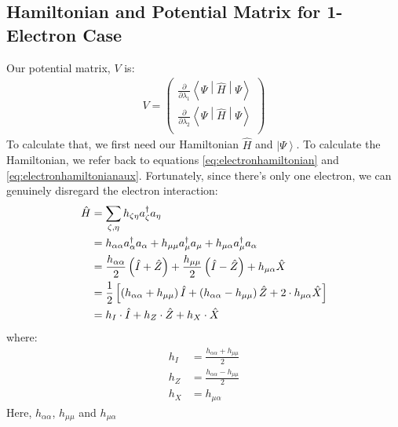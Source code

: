 \documentclass{aux/ttuthes2007}
\newcommand{\ket}[1]{\ensuremath{\left|#1\right\rangle}}
\newcommand{\sandwich}[3]{\left< #1 \middle\vert #2 \middle\vert #3 \right>}
\newcommand{\paren}[1]{\left( #1 \right)}
\newcommand{\pd}[1]{\frac{\partial}{\partial #1}}
\newcommand{\anio}[1]{a_{\oo{#1}}}
\newcommand{\aniu}[1]{a_{\uo{#1}}}
\newcommand{\anig}[1]{a_{\go{#1}}}
\newcommand{\creo}[1]{a^\dagger_{\oo{#1}}}
\newcommand{\creu}[1]{a^\dagger_{\uo{#1}}}
\newcommand{\creg}[1]{a^\dagger_{\go{#1}}}
\newcommand{\uo}[1]{
		\IfEqCase{#1}{
			{0}{\mu}
			{1}{\nu}
			{2}{\xi}
		}[\PackageError{uo}{Undefined option to uo: #1}{}]
}
\newcommand{\oo}[1]{
		\IfEqCase{#1}{
			{0}{\alpha}
			{1}{\beta}
			{2}{\gamma}
		}[\PackageError{unocorb}{Undefined option to unuo: #1}{}]
}
\newcommand{\go}[1]{
		\IfEqCase{#1}{
			{0}{\zeta}
			{1}{\eta}
			{2}{\iota}
			{3}{\kappa}
		}[\PackageError{unocorb}{Undefined option to go: #1}{}]
}
\begin{document}
\subsection{\textbf{Hamiltonian and Potential Matrix for 1-Electron Case}}

Our potential matrix, $V$ is:
%
\begin{equation*}
	\begin{split}
		V = \begin{pmatrix}
			\pd {\lambda_1} \sandwich {\Psi}{\hat H}{\Psi}\\
			\pd {\lambda_2} \sandwich {\Psi}{\hat H}{\Psi}\\
		\end{pmatrix}
	\end{split}
\end{equation*}
%
To calculate that, we first need our Hamiltonian $\hat H$ and $\ket \Psi$. To calculate the Hamiltonian, we refer back to equations \ref{eq:electronhamiltonian} and \ref{eq:electronhamiltonianaux}. Fortunately, since there's only one electron, we can genuinely disregard the electron interaction:
%
\begin{equation*}
	\begin{split}
	\hat H  &= \sum_{\go 0, \go 1}h_{\go 0 \go 1}\creg 0 \anig 1 \\
		&= {h_{\alpha\alpha}} \creo 0 \anio 0
		+ {h_{\mu\mu}} \creu 0 \aniu 0
		+ h_{\mu\alpha} \creu 0 \anio 0 
%
		\\
%
		&= \frac{h_{\alpha\alpha}}{2} \paren{\hat I + \hat Z}
		+ \frac{h_{\mu\mu}}{2} \paren{\hat I - \hat Z}
		+ h_{\mu\alpha} \hat X
%
	\\
%
		&= 	\frac{1}{2} \left[ 
			\paren{h_{\alpha\alpha} + h_{\mu\mu}} \hat I 
		+	\paren{h_{\alpha\alpha} - h_{\mu\mu}} \hat Z
		+ 	2 \cdot h_{\mu\alpha} \hat X
	\right]
%
	\\
%
		&=	h_{I} \cdot \hat I 
		+	h_{Z} \cdot \hat Z
		+	h_{X} \cdot \hat X
	\end{split}
\end{equation*}
%
where:
%
\begin{equation*}
	\begin{split}
			h_{I}
		&=	\frac{h_{\alpha\alpha} + h_{\mu\mu}} 2
%
	\\
%
			h_{Z}
		&=	\frac{h_{\alpha\alpha} - h_{\mu\mu}} 2
%
	\\
%
			h_{X}
		&= 	h_{\mu\alpha}
%
	\end{split}
\end{equation*}
%
Here,
$
h_{\alpha\alpha}$, $h_{\mu\mu}$ and $h_{\mu\alpha}$
\end{document}
